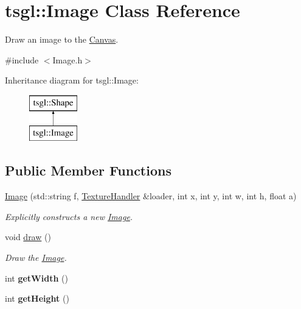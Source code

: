 \hypertarget{classtsgl_1_1_image}{}\section{tsgl\+:\+:Image Class Reference}
\label{classtsgl_1_1_image}


Draw an image to the \hyperlink{classtsgl_1_1_canvas}{Canvas}.  




{\ttfamily \#include $<$Image.\+h$>$}

Inheritance diagram for tsgl\+:\+:Image\+:\begin{figure}[H]
\begin{center}
\leavevmode
\includegraphics[height=2.000000cm]{classtsgl_1_1_image}
\end{center}
\end{figure}
\subsection*{Public Member Functions}
\begin{DoxyCompactItemize}
\item 
\hyperlink{classtsgl_1_1_image_ae468f22b369f66494d11816a6f41382b}{Image} (std\+::string f, \hyperlink{classtsgl_1_1_texture_handler}{Texture\+Handler} \&loader, int x, int y, int w, int h, float a)
\begin{DoxyCompactList}\small\item\em Explicitly constructs a new \hyperlink{classtsgl_1_1_image}{Image}. \end{DoxyCompactList}\item 
void \hyperlink{classtsgl_1_1_image_a85732de312b98dd5ce5a9cc319bbf8c5}{draw} ()
\begin{DoxyCompactList}\small\item\em Draw the \hyperlink{classtsgl_1_1_image}{Image}. \end{DoxyCompactList}\item 
\hypertarget{classtsgl_1_1_image_af01d5f815b91f20fd441f9bcec671d79}{}int {\bfseries get\+Width} ()\label{classtsgl_1_1_image_af01d5f815b91f20fd441f9bcec671d79}

\item 
\hypertarget{classtsgl_1_1_image_afa939262dcf32c9a504efe30a8de5c58}{}int {\bfseries get\+Height} ()\label{classtsgl_1_1_image_afa939262dcf32c9a504efe30a8de5c58}

\end{DoxyCompactItemize}
